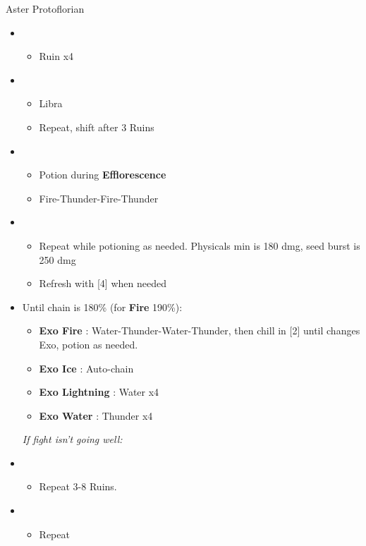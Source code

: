 \begin{battle}{Aster Protoflorian}
\begin{multicols}{2}
\begin{itemize}
    \item \first
    \begin{itemize}
        \item Ruin x4
    \end{itemize}
    \item \third
    \begin{itemize}
        \item Libra
        \item Repeat, shift after 3 Ruins
    \end{itemize}
    \item \fourth
    \begin{itemize}
        \item Potion during \textbf{Efflorescence}
        \item Fire-Thunder-Fire-Thunder
    \end{itemize}
    \item \fifth
    \begin{itemize}
        \item Repeat while potioning as needed. Physicals min is 180 dmg, seed burst is 250 dmg
        \item Refresh with [4] when needed
    \end{itemize}
    \item Until chain is 180\% (for \textbf{Fire} 190\%):
    \begin{itemize}
        \item \textbf{Exo Fire} : Water-Thunder-Water-Thunder, then chill in [2] until changes Exo, potion as needed.
        \item \textbf{Exo Ice} : Auto-chain
        \item \textbf{Exo Lightning} : Water x4
        \item \textbf{Exo Water} : Thunder x4
    \end{itemize}
    {\it If fight isn't going well:} 
    \item \first
    \begin{itemize}
        \item Repeat 3-8 Ruins.
    \end{itemize}
    \columnbreak
    \item \fourth
    \begin{itemize}
        \item Repeat

\end{itemize}
\end{itemize}
\end{multicols}
\end{battle}
